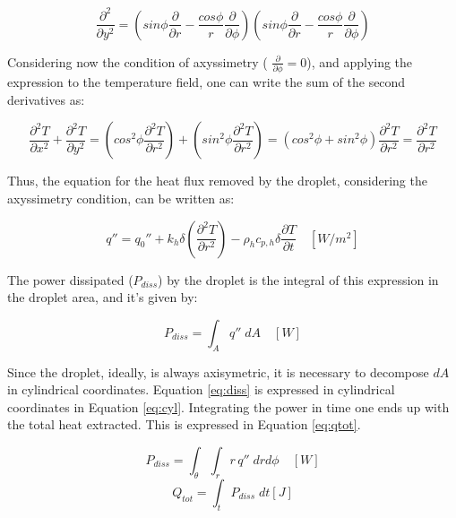 \begin{equation}
\frac{\partial^2}{\partial y^2}=(sin \phi \frac{\partial}{\partial r} - \frac{cos \phi}{r}\frac{\partial}{\partial \phi})(sin \phi \frac{\partial}{\partial r} - \frac{cos \phi}{r}\frac{\partial}{\partial \phi})
\end{equation}

\par Considering now the condition of axyssimetry ( $\frac{\partial}{\partial \phi}=0$), and applying the expression to the temperature field, one can write the sum of the second derivatives as:

\begin{equation} \label{eq:coord}
\frac{\partial^2 T}{\partial x^2}+\frac{\partial^2 T}{\partial y^2}=(cos^2 \phi \frac{\partial^2 T}{\partial r^2}) + (sin^2 \phi \frac{\partial^2 T}{\partial r^2})= (cos^2 \phi + sin^2 \phi )\frac{\partial^2 T}{\partial r^2} = \frac{\partial^2 T}{\partial r^2}
\end{equation}

\par Thus, the equation for the heat flux removed by the droplet, considering the axyssimetry condition, can be written as:

\begin{equation}\label{eq:heatf}
q''=q_0''+k_h \delta (\frac{{\partial}^2 T}{\partial r^2})-\rho_h c_{p,h} \delta \frac{{\partial} T}{\partial t} \quad [W/m^2]
\end{equation}

\par The power dissipated ($P_{diss}$) by the droplet is the integral of this expression in the droplet area, and it's given by:

\begin{equation}\label{eq:diss}
P_{diss}= \int_{A} q'' \; dA \quad [W]
\end{equation}

\par Since the droplet, ideally, is always axisymetric, it is necessary to decompose $dA$ in cylindrical coordinates. Equation \ref{eq:diss} is expressed in cylindrical coordinates in Equation \ref{eq:cyl}. Integrating the power in time one ends up with the total heat extracted. This is expressed in Equation \ref{eq:qtot}.

\begin{equation} \label{eq:cyl}
P_{diss} = \int_\theta \int_r r \, q'' \; dr d\phi \quad [W]
\end{equation}
\begin{equation} \label{eq:qtot}
Q_{tot} = \int_t P_{diss} \; dt [J]
\end{equation}

